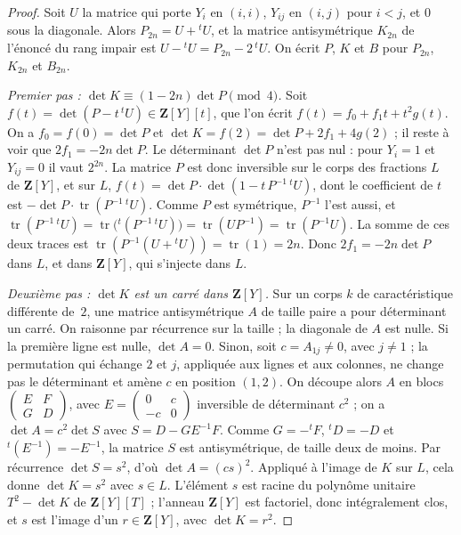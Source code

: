 \begin{proof}
Soit $U$ la matrice qui porte $Y_i$ en $(i, i)$, $Y_{ij}$ en $(i, j)$ pour $i < j$, et $0$ sous la diagonale. Alors $P_{2n} = U + {}^tU$, et la matrice antisymétrique $K_{2n}$ de l'énoncé du rang impair est $U - {}^tU = P_{2n} - 2\,{}^tU$. On écrit $P$, $K$ et $B$ pour $P_{2n}$, $K_{2n}$ et $B_{2n}$.

\emph{Premier pas : $\det K \equiv (1 - 2n) \det P \pmod 4$.} Soit $f(t) = \det(P - t\,{}^tU) \in \mathbf Z[Y][t]$, que l'on écrit $f(t) = f_0 + f_1 t + t^2 g(t)$. On a $f_0 = f(0) = \det P$ et $\det K = f(2) = \det P + 2f_1 + 4g(2)$ ; il reste à voir que $2f_1 = -2n \det P$. Le déterminant $\det P$ n'est pas nul : pour $Y_i = 1$ et $Y_{ij} = 0$ il vaut $2^{2n}$. La matrice $P$ est donc inversible sur le corps des fractions $L$ de $\mathbf Z[Y]$, et sur $L$, $f(t) = \det P \cdot \det(1 - t\,P^{-1}\,{}^tU)$, dont le coefficient de $t$ est $-\det P \cdot \operatorname{tr}(P^{-1}\,{}^tU)$. Comme $P$ est symétrique, $P^{-1}$ l'est aussi, et $\operatorname{tr}(P^{-1}\,{}^tU) = \operatorname{tr}\bigl({}^t(P^{-1}\,{}^tU)\bigr) = \operatorname{tr}(U P^{-1}) = \operatorname{tr}(P^{-1} U)$. La somme de ces deux traces est $\operatorname{tr}(P^{-1}(U + {}^tU)) = \operatorname{tr}(1) = 2n$. Donc $2f_1 = -2n \det P$ dans $L$, et dans $\mathbf Z[Y]$, qui s'injecte dans $L$.

\emph{Deuxième pas : $\det K$ est un carré dans $\mathbf Z[Y]$.} Sur un corps $k$ de caractéristique différente de~$2$, une matrice antisymétrique $A$ de taille paire a pour déterminant un carré. On raisonne par récurrence sur la taille ; la diagonale de $A$ est nulle. Si la première ligne est nulle, $\det A = 0$. Sinon, soit $c = A_{1j} \neq 0$, avec $j \neq 1$ ; la permutation qui échange $2$ et $j$, appliquée aux lignes et aux colonnes, ne change pas le déterminant et amène $c$ en position $(1, 2)$. On découpe alors $A$ en blocs $\begin{pmatrix} E & F \\ G & D \end{pmatrix}$, avec $E = \begin{pmatrix} 0 & c \\ -c & 0 \end{pmatrix}$ inversible de déterminant $c^2$ ; on a $\det A = c^2 \det S$ avec $S = D - G E^{-1} F$. Comme $G = -{}^tF$, ${}^tD = -D$ et ${}^t(E^{-1}) = -E^{-1}$, la matrice $S$ est antisymétrique, de taille deux de moins. Par récurrence $\det S = s^2$, d'où $\det A = (cs)^2$. Appliqué à l'image de $K$ sur $L$, cela donne $\det K = s^2$ avec $s \in L$. L'élément $s$ est racine du polynôme unitaire $T^2 - \det K$ de $\mathbf Z[Y][T]$ ; l'anneau $\mathbf Z[Y]$ est factoriel, donc intégralement clos, et $s$ est l'image d'un $r \in \mathbf Z[Y]$, avec $\det K = r^2$.


\end{proof}
